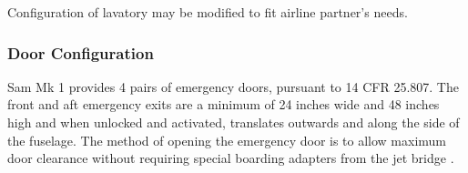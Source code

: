 Configuration of lavatory may be modified to fit airline partner's needs.

\subsubsection{Door Configuration}
Sam Mk 1 provides 4 pairs of emergency doors, pursuant to 14 CFR 25.807.  The front and aft emergency exits are a minimum of 24 inches wide and 48 inches high and when unlocked and activated, translates outwards and along the side of the fuselage.  The method of opening the emergency door is to allow maximum door clearance without requiring special boarding adapters from the jet bridge \cite{cfr}.








